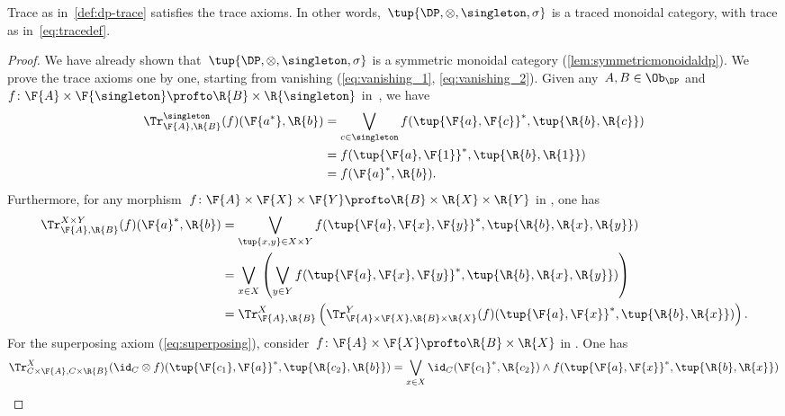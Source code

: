 \begin{lemma}
    Trace as in~\cref{def:dp-trace} satisfies the trace axioms. In other words,~$\tup{\DP, \otimes, \singleton, \sigma}$ is a traced monoidal category, with trace as in~\cref{eq:tracedef}.
\end{lemma}
\begin{proof}
    We have already shown that~$\tup{\DP,\otimes,\singleton,\sigma}$ is a symmetric monoidal category (\cref{lem:symmetricmonoidaldp}).
    We prove the trace axioms one by one, starting from vanishing (\cref{eq:vanishing_1}, \cref{eq:vanishing_2}). Given any~$A,B\in \Ob_\DP$ and~$f\colon \F{A}\times \F{\singleton}\profto \R{B}\times \R{\singleton}$ in~\DP, we have
    \begin{equation}
        \begin{aligned}
            \Tr_{\F{A},\R{B}}^{\singleton}(f)(\F{a^*},\R{b})&=\bigvee_{c\in \singleton}f(\tup{\F{a},\F{c}}^*,\tup{\R{b},\R{c}})\\
            &=f(\tup{\F{a},\F{1}}^*,\tup{\R{b},\R{1}})\\
            &=f(\F{a}^*,\R{b}).
        \end{aligned}
    \end{equation}
    Furthermore, for any morphism~$f\colon \F{A}\times \F{X}\times \F{Y} \profto \R{B}\times \R{X} \times \R{Y}$ in \DP, one has
    \begin{equation}
        \begin{aligned}
            \Tr_{\F{A},\R{B}}^{X\times Y}(f)(\F{a}^*,\R{b})&=\bigvee_{\tup{x,y} \in X\times Y} f(\tup{\F{a},\F{x},\F{y}}^*,\tup{\R{b},\R{x},\R{y}})\\
            &=\bigvee_{x \in X}\left(\bigvee_{y \in Y} f(\tup{\F{a},\F{x},\F{y}}^*,\tup{\R{b},\R{x},\R{y}})\right)\\
            &=\Tr_{\F{A},\R{B}}^X\left(
            \Tr_{\F{A}\times \F{X},\R{B}\times \R{X}}^Y(f)(\tup{\F{a},\F{x}}^*,\tup{\R{b},\R{x}})\right).
        \end{aligned}
    \end{equation}
    For the superposing axiom (\cref{eq:superposing}), consider~$f\colon \F{A}\times \F{X}\profto \R{B}\times \R{X}$ in \DP. One has
    \begin{equation}
        \begin{aligned}
            \Tr_{C\times \F{A},C\times \R{B}}^{X}(\id_C\otimes f)(\tup{\F{c_1},\F{a}}^*,\tup{\R{c_2},\R{b}})&=\bigvee_{x\in X} \id_C(\F{c_1}^*,\R{c_2})\wedge f(\tup{\F{a},\F{x}}^*,\tup{\R{b},\R{x}})\\

\end{aligned}
\end{equation}
\end{proof}
